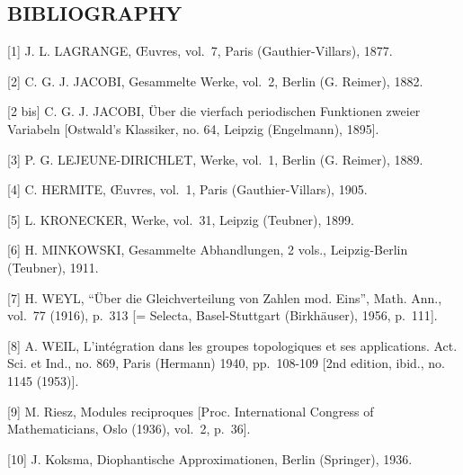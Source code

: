 \subsection*{BIBLIOGRAPHY}

{[}1{]} J. L. LAGRANGE, Œuvres, vol.~7, Paris (Gauthier-Villars), 1877.

{[}2{]} C. G. J. JACOBI, Gesammelte Werke, vol.~2, Berlin (G. Reimer), 1882.

{[}2 bis{]} C. G. J. JACOBI, Über die vierfach periodischen Funktionen zweier Variabeln {[}Ostwald's Klassiker, no. 64, Leipzig (Engelmann), 1895{]}.

{[}3{]} P. G. LEJEUNE-DIRICHLET, Werke, vol.~1, Berlin (G. Reimer), 1889.

{[}4{]} C. HERMITE, Œuvres, vol.~1, Paris (Gauthier-Villars), 1905.

{[}5{]} L. KRONECKER, Werke, vol.~31, Leipzig (Teubner), 1899.

{[}6{]} H. MINKOWSKI, Gesammelte Abhandlungen, 2 vols., Leipzig-Berlin (Teubner), 1911.

{[}7{]} H. WEYL, ``Über die Gleichverteilung von Zahlen mod. Eins'', Math. Ann., vol.~77 (1916), p.~313 {[}= Selecta, Basel-Stuttgart (Birkhäuser), 1956, p.~111{]}.

{[}8{]} A. WEIL, L'intégration dans les groupes topologiques et ses applications. Act. Sci. et Ind., no. 869, Paris (Hermann) 1940, pp.~108-109 {[}2nd edition, ibid., no. 1145 (1953){]}.

{[}9{]} M. Riesz, Modules reciproques {[}Proc. International Congress of Mathematicians, Oslo (1936), vol.~2, p.~36{]}.

{[}10{]} J. Koksma, Diophantische Approximationen, Berlin (Springer), 1936.

